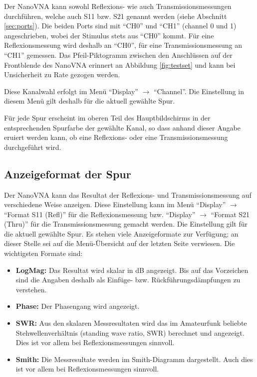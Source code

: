 \documentclass[twoside,a4paper,11pt,halfparskip,DIV=11,notitlepage]{scrartcl}
\begin{document}
Der NanoVNA kann sowohl Reflexions- wie auch Transmissionsmessungen durchführen,
welche auch S11 bzw. S21 genannt werden (siehe Abschnitt \ref{sec:ports}). Die beiden Ports sind mit ``CH0'' und ``CH1''
(channel 0 und 1) angeschrieben, wobei der Stimulus stets aus ``CH0'' kommt.
Für eine Reflexionsmessung wird deshalb an ``CH0'', für eine Transmissionsmessung
an ``CH1'' gemessen. Das Pfeil-Piktogramm zwischen den Anschlüssen auf der
Frontblende des NanoVNA erinnert an Abbildung \ref{fig:testset}
und kann bei Unsicherheit zu Rate gezogen werden.

Diese Kanalwahl erfolgt im Menü ``Display'' $\longrightarrow$ ``Channel''.
Die Einstellung in diesem Menü gilt deshalb für die aktuell gewählte Spur.

Für jede Spur erscheint im oberen Teil des Hauptbildschirms in der
entsprechenden Spurfarbe der gewählte Kanal, so dass anhand dieser Angabe
eruiert werden kann, ob eine Reflexions- oder eine Transmissionsmessung
durchgeführt wird.

\subsection{Anzeigeformat der Spur}\label{sec:nanovnaformat} %
Der NanoVNA kann das Resultat der Reflexions- und Transmissionsmessung auf verschiedene
Weise anzeigen. Diese Einstellung kann im Menü ``Display'' $\longrightarrow$ ``Format S11 (Refl)''
für die Reflexionsmessung bzw. ``Display'' $\longrightarrow$ ``Format S21 (Thru)''
für die Transmissionsmessung gemacht werden. Die Einstellung gilt für die aktuell gewählte
Spur. Es stehen viele Anzeigeformate zur Verfügung; an dieser Stelle sei auf die Menü-Übersicht
auf der letzten Seite verwiesen. Die wichtigsten Formate sind:

\begin{itemize}
    \item \textbf{LogMag:} Das Resultat wird skalar in dB angezeigt. Bis auf das Vorzeichen sind
        die Angaben deshalb als Einfüge- bzw. Rückführungsdämpfungen zu verstehen.
    \item \textbf{Phase:} Der Phasengang wird angezeigt.
    \item \textbf{SWR:} Aus den skalaren Messresultaten wird das im Amateurfunk
        beliebte Stehwellenverhältnis (standing wave ratio, SWR) berechnet und
        angezeigt. Dies ist vor allem bei Reflexionsmessungen sinnvoll.
    \item \textbf{Smith:} Die Messresultate werden im Smith-Diagramm dargestellt. Auch dies
        ist vor allem bei Reflexionsmessungen sinnvoll.
\end{itemize}
\end{document}
